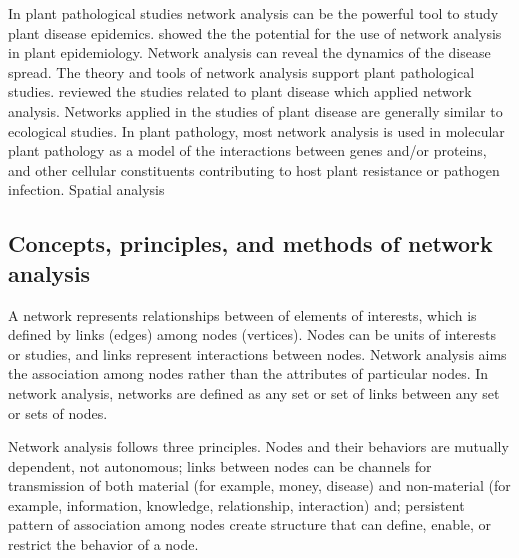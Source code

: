 In plant pathological studies network analysis can be the powerful tool to study plant disease epidemics.  showed the  the potential for the use of network analysis in plant epidemiology. Network analysis can reveal the dynamics of the disease spread. The theory and tools of network analysis support plant pathological studies.  reviewed the studies related to plant disease which applied network analysis. Networks applied in the studies of plant disease are generally similar to ecological studies. In plant pathology, most network analysis is used in molecular plant pathology as a model of the interactions between genes and/or proteins, and other cellular constituents contributing to host plant resistance or pathogen infection. Spatial analysis 


\subsection*{Concepts, principles, and methods of network analysis}

A network represents relationships between of elements of interests, which is defined by links (edges) among nodes (vertices). Nodes can be units of interests or studies, and links represent interactions between nodes. Network analysis aims the association among nodes rather than the attributes of particular nodes. In network analysis, networks are defined as any set or set of links between any set or sets of nodes.


Network analysis follows three principles. Nodes and their behaviors are mutually dependent, not autonomous; links between nodes can be channels for transmission of both material (for example, money, disease) and non-material (for example, information, knowledge, relationship, interaction) and; persistent pattern of association among nodes create structure that can define, enable, or restrict the behavior of a node.  


